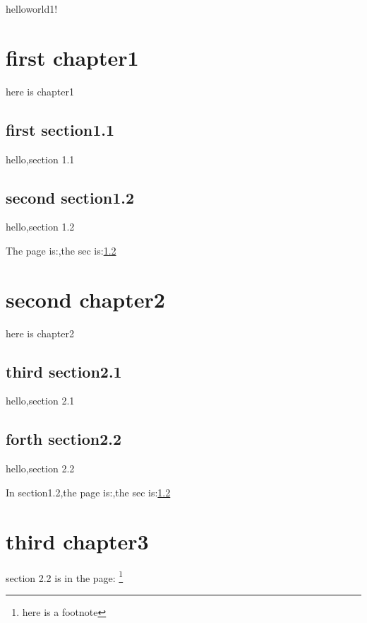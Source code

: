 \documentclass[10pt,titlepage]{report} %
\begin{document}
helloworld1!
\newpage%
\chapter{first chapter1}
here is chapter1
\section{first section1.1}
hello,section 1.1
\section{second section1.2}
\label{mysec1.2}%
hello,section 1.2 %

The page is:\pageref{mysec1.2},the sec is:\ref{mysec1.2}%


\chapter{second chapter2} %
here is chapter2
\section{third section2.1}
hello,section 2.1
\newpage
\section{forth section2.2}
\label{mysec2.2}
hello,section 2.2

In section1.2,the page is:\pageref{mysec1.2},the sec is:\ref{mysec1.2}

\chapter{third chapter3} 
section 2.2 is in the page:\pageref{mysec2.2}
\footnote{here is a footnote}
\end{document}
